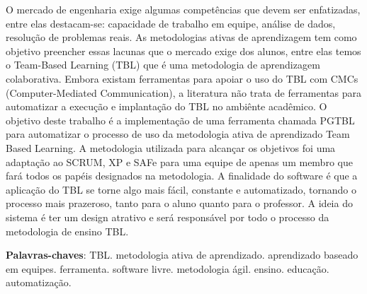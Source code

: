 \begin{resumo}
  O mercado de engenharia exige algumas competências que devem ser enfatizadas, entre elas destacam-se: capacidade
  de trabalho em equipe, análise de dados, resolução de problemas reais. As metodologias ativas de aprendizagem tem
  como objetivo preencher essas lacunas que o mercado exige dos alunos, entre elas temos o Team-Based Learning (TBL)
  que é uma metodologia de aprendizagem colaborativa. Embora existam ferramentas para apoiar o uso do TBL com CMCs
  (Computer-Mediated Communication), a literatura não trata de ferramentas para automatizar a execução e implantação
  do TBL no ambiênte acadêmico. O objetivo deste trabalho é a implementação de uma ferramenta chamada PGTBL para
  automatizar o processo de uso da metodologia ativa de aprendizado Team Based Learning. A metodologia utilizada
  para alcançar os objetivos foi uma adaptação ao SCRUM, XP e SAFe para uma equipe de apenas um membro que fará todos
  os papéis designados na metodologia. A finalidade do software é que a aplicação do TBL se torne algo mais fácil,
  constante e automatizado, tornando o processo mais prazeroso, tanto para o aluno quanto para o professor. A ideia
  do sistema é ter um design atrativo e será responsável por todo o processo da metodologia de ensino TBL.

 \vspace{\onelineskip}

 \noindent
 \textbf{Palavras-chaves}: TBL. metodologia ativa de aprendizado. aprendizado baseado em equipes. ferramenta. software
  livre. metodologia ágil. ensino. educação. automatização.
\end{resumo}
